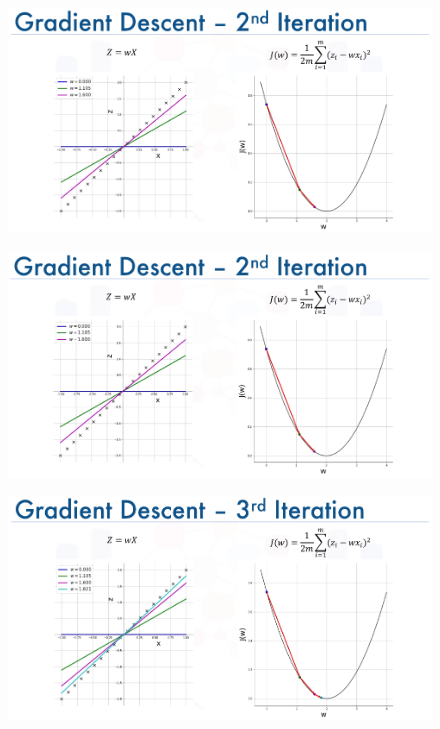 \documentclass[10pt, compress]{beamer}
\begin{document}
\begin{frame}
  \begin{figure}
    \includegraphics[width=1\linewidth]{imgs/edx_dl_keras/gd7}
  \end{figure}
\end{frame}

\begin{frame}
  \begin{figure}
    \includegraphics[width=1\linewidth]{imgs/edx_dl_keras/gd8}
  \end{figure}
\end{frame}

\begin{frame}
  \begin{figure}
    \includegraphics[width=1\linewidth]{imgs/edx_dl_keras/gd9}
  \end{figure}
\end{frame}
\end{document}
